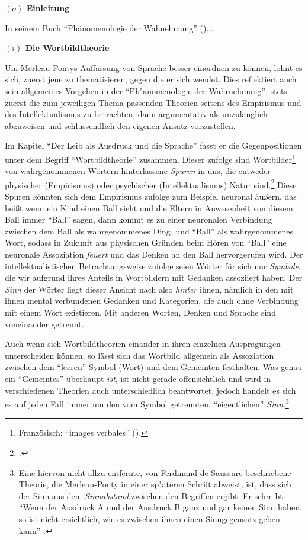 \documentclass[a4paper, 12pt]{article}
\begin{document}
\begin{onehalfspace} 

\noindent\textbf{$(o)$ Einleitung}

\noindent In seinem Buch "`Phänomenologie der Wahnehmung"' (\Cite{merleau1966phanomenologie})...


\vspace{5mm}

\noindent\textbf{$(i)$ Die Wortbildtheorie}

\noindent Um Merleau-Pontys Auffassung von Sprache besser einordnen zu können, lohnt es sich, zuerst jene zu thematisieren, gegen die er sich wendet. Dies reflektiert auch sein allgemeines Vorgehen in der "`Ph"anomenologie der Wahrnehmung"', stets zuerst die zum jeweiligen Thema passenden Theorien seitens des Empirismus und des Intellektualismus zu betrachten, dann argumentativ als unzulänglich abzuweisen und schlussendlich den eigenen Ansatz vorzustellen. 

Im Kapitel "`Der Leib als Ausdruck und die Sprache"' fasst er die Gegenpositionen unter dem Begriff "`Wortbildtheorie"' zusammen. Dieser zufolge sind Wortbilder\footnote{Französisch: "`images verbales"' (\Cite[siehe][S. 203]{franzoesisch_phen}).} von wahrgenommenen Wörtern hinterlassene \emph{Spuren} in uns, die entweder physischer (Empirismus) oder psychischer (Intellektualismus) Natur sind.\footnote{\Cite[Vgl.][S. 208]{merleau1966phanomenologie}.} Diese Spuren könnten sich dem Empirismus zufolge zum Beispiel neuronal äußern, das heißt wenn ein Kind einen Ball sieht und die Eltern in Anwesenheit von diesem Ball immer "`Ball"' sagen, dann kommt es zu einer neuronalen Verbindung zwischen dem Ball als wahrgenommenes Ding, und "`Ball"' als wahrgenommenes Wort, sodass in Zukunft aus physischen Gründen beim Hören von "`Ball"' eine neuronale Assoziation \emph{feuert} und das Denken an den Ball hervorgerufen wird. Der intellektualistischen Betrachtungsweise zufolge seien Wörter für sich nur \emph{Symbole}, die wir aufgrund ihres Anteils in Wortbildern mit Gedanken assoziiert haben. Der \emph{Sinn} der Wörter liegt dieser Ansicht nach also \emph{hinter} ihnen, nämlich in den mit ihnen mental verbundenen Gedanken und Kategorien, die auch ohne Verbindung mit einem Wort existieren. Mit anderen Worten, Denken und Sprache sind voneinander getrennt.

Auch wenn sich Wortbildtheorien einander in ihren einzelnen Ausprägungen unterscheiden können, so lässt sich das Wortbild allgemein als Assoziation zwischen dem "`leeren"' Symbol (Wort) und dem Gemeinten festhalten. Was genau ein "`Gemeintes"' überhaupt \emph{ist}, ist nicht gerade offensichtlich und wird in verschiedenen Theorien auch unterschiedlich beantwortet, jedoch handelt es sich es auf jeden Fall immer um den vom Symbol getrennten, "`eigentlichen"' \emph{Sinn}.\footnote{Eine hiervon nicht allzu entfernte, von Ferdinand de Saussure beschriebene Theorie, die Merleau-Ponty in einer sp"ateren Schrift abweist, ist, dass sich der Sinn aus dem \emph{Sinnabstand} zwischen den Begriffen ergibt. Er schreibt: "`Wenn der Ausdruck A und der Ausdruck B ganz und gar keinen Sinn haben, so ist nicht ersichtlich, wie es zwischen ihnen einen Sinngegensatz geben kann"' .} 


\end{onehalfspace}
\end{document}
